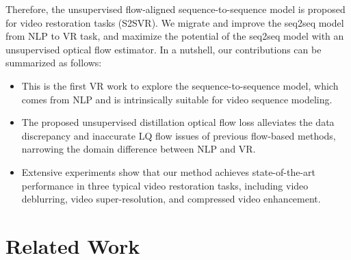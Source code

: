 \documentclass[nohyperref]{article}
\theoremstyle{plain}
\theoremstyle{definition}
\theoremstyle{remark}
\begin{document}
Therefore, the unsupervised flow-aligned sequence-to-sequence model is proposed for video restoration tasks (S2SVR). We migrate and improve the seq2seq model from NLP to VR task, and maximize the potential of the seq2seq model with an unsupervised optical flow estimator. In a nutshell, our contributions can be summarized as follows:

\vspace{-1mm}
\begin{itemize}
    \vspace{-3.0mm}
    \item This is the first VR work to explore the sequence-to-sequence model, which comes from NLP and is intrinsically suitable for video sequence modeling.
    \vspace{-2.0mm}
    \item The proposed unsupervised distillation optical flow loss alleviates the data discrepancy and inaccurate LQ flow issues of previous flow-based methods, narrowing the domain difference between NLP and VR.
    \vspace{-2.0mm}
    \item Extensive experiments show that our method achieves state-of-the-art performance in three typical video restoration tasks, including video deblurring, video super-resolution, and compressed video enhancement. 
\end{itemize}
\vspace{-5mm}

\section{Related Work}
\vspace{-1mm}
\end{document}
